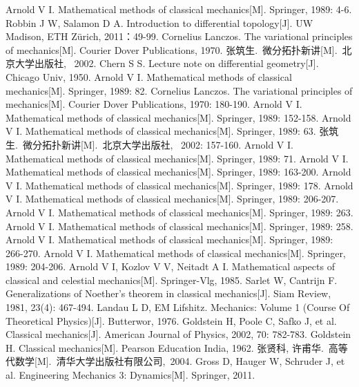 \documentclass[UTF8,10.5pt,a4paper]{ctexart}
\numberwithin{equation}{section}
\theoremstyle{definition}
\theoremstyle{definition}
\begin{document}
\begin{thebibliography}{MM}
\addtolength{\itemsep}{-0.5em}
\begin{small}
 Arnold V I. Mathematical methods of classical mechanics[M]. Springer, 1989: 4-6.
 Robbin J W, Salamon D A. Introduction to differential topology[J]. UW Madison, ETH Zürich, 2011：49-99.
 Cornelius Lanczos. The variational principles of mechanics[M]. Courier Dover Publications, 1970.
 张筑生.\ 微分拓扑新讲[M].\ 北京大学出版社, \ 2002.
 Chern S S. Lecture note on differential geometry[J]. Chicago Univ, 1950.
 Arnold V I. Mathematical methods of classical mechanics[M]. Springer, 1989: 82.
 Cornelius Lanczos. The variational principles of mechanics[M]. Courier Dover Publications, 1970: 180-190.
 Arnold V I. Mathematical methods of classical mechanics[M]. Springer, 1989: 152-158.
 Arnold V I. Mathematical methods of classical mechanics[M]. Springer, 1989: 63.
 张筑生.\ 微分拓扑新讲[M].\ 北京大学出版社, \ 2002: 157-160.
 Arnold V I. Mathematical methods of classical mechanics[M]. Springer, 1989: 71.
 Arnold V I. Mathematical methods of classical mechanics[M]. Springer, 1989: 163-200.
 Arnold V I. Mathematical methods of classical mechanics[M]. Springer, 1989: 178.
 Arnold V I. Mathematical methods of classical mechanics[M]. Springer, 1989: 206-207.
 Arnold V I. Mathematical methods of classical mechanics[M]. Springer, 1989: 263.
 Arnold V I. Mathematical methods of classical mechanics[M]. Springer, 1989: 258.
 Arnold V I. Mathematical methods of classical mechanics[M]. Springer, 1989: 266-270.
 Arnold V I. Mathematical methods of classical mechanics[M]. Springer, 1989: 204-206.
 Arnold V I, Kozlov V V, Neitadt A I. Mathematical aspects of classical and celestial mechanics[M]. Springer-Vlg, 1985.
 Sarlet W, Cantrijn F. Generalizations of Noether's theorem in classical mechanics[J]. Siam Review, 1981, 23(4): 467-494.
 Landau L D, EM Lifshitz. Mechanics: Volume 1 (Course Of Theoretical Physics)[J]. Butterwor, 1976.
 Goldstein H, Poole C, Safko J, et al. Classical mechanics[J]. American Journal of Physics, 2002, 70: 782-783.
 Goldstein H. Classical mechanics[M]. Pearson Education India, 1962.
 张贤科, 许甫华.\ 高等代数学[M].\ 清华大学出版社有限公司,\ 2004.
 Gross D, Hauger W, Schruder J, et al. Engineering Mechanics 3: Dynamics[M]. Springer, 2011.


\end{small}
\end{thebibliography}
\end{document}
